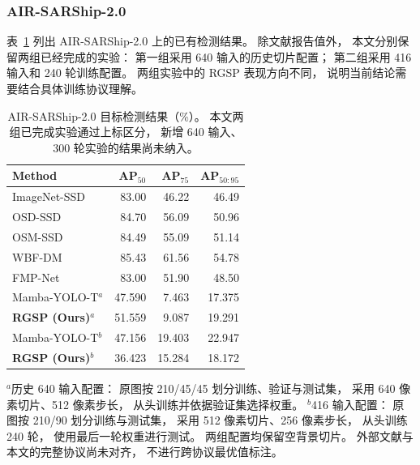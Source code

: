 \documentclass[journal]{IEEEtran}
\begin{document}
\subsubsection{AIR-SARShip-2.0}
\label{sec:air_sarship_results}

表~\ref{tab:air_sarship_comparison}
列出 AIR-SARShip-2.0 上的已有检测结果。
除文献报告值外，
本文分别保留两组已经完成的实验：
第一组采用 640 输入的历史切片配置；
第二组采用 416 输入和 240 轮训练配置。
两组实验中的 RGSP 表现方向不同，
说明当前结论需要结合具体训练协议理解。

\begin{table}[!t]
\centering
\small
\setlength{\tabcolsep}{5pt}
\caption{AIR-SARShip-2.0 目标检测结果（\%）。
本文两组已完成实验通过上标区分，
新增 640 输入、300 轮实验的结果尚未纳入。}
\label{tab:air_sarship_comparison}
\begin{tabular*}{\textwidth}{@{\extracolsep{\fill}}lrrr}
\toprule
Method & AP$_{50}$ & AP$_{75}$ & AP$_{50:95}$ \\
\midrule
ImageNet-SSD      & 83.00 & 46.22 & 46.49 \\
OSD-SSD           & 84.70 & 56.09 & 50.96 \\
OSM-SSD           & 84.49 & 55.09 & 51.14 \\
WBF-DM            & 85.43 & 61.56 & 54.78 \\
FMP-Net           & 83.00 & 51.90 & 48.50 \\
\midrule
Mamba-YOLO-T$^{a}$
                  & 47.590 & 7.463  & 17.375 \\
\textbf{RGSP (Ours)}$^{a}$
                  & 51.559 & 9.087  & 19.291 \\
Mamba-YOLO-T$^{b}$
                  & 47.156 & 19.403 & 22.947 \\
\textbf{RGSP (Ours)}$^{b}$
                  & 36.423 & 15.284 & 18.172 \\
\bottomrule
\end{tabular*}

\smallskip
\begin{minipage}{\linewidth}
\footnotesize
$^{a}$历史 640 输入配置：
原图按 210/45/45 划分训练、验证与测试集，
采用 640 像素切片、512 像素步长，
从头训练并依据验证集选择权重。
$^{b}$416 输入配置：
原图按 210/90 划分训练与测试集，
采用 512 像素切片、256 像素步长，
从头训练 240 轮，
使用最后一轮权重进行测试。
两组配置均保留空背景切片。
外部文献与本文的完整协议尚未对齐，
不进行跨协议最优值标注。
\end{minipage}
\end{table}
\end{document}
